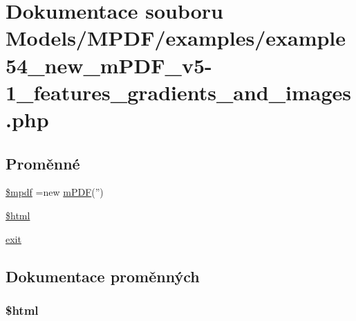 \hypertarget{example54__new__m_p_d_f__v5-1__features__gradients__and__images_8php}{\section{Dokumentace souboru Models/\-M\-P\-D\-F/examples/example54\-\_\-new\-\_\-m\-P\-D\-F\-\_\-v5-\/1\-\_\-features\-\_\-gradients\-\_\-and\-\_\-images.php}
\label{example54__new__m_p_d_f__v5-1__features__gradients__and__images_8php}
}
\subsection*{Proměnné}
\begin{DoxyCompactItemize}
\item 
\hyperlink{example54__new__m_p_d_f__v5-1__features__gradients__and__images_8php_ad028f81910d6cbab9b184d2214b3a8f8}{\$mpdf} =new \hyperlink{classm_p_d_f}{m\-P\-D\-F}('')
\item 
\hyperlink{example54__new__m_p_d_f__v5-1__features__gradients__and__images_8php_a6f96e7fc92441776c9d1cd3386663b40}{\$html}
\item 
\hyperlink{example54__new__m_p_d_f__v5-1__features__gradients__and__images_8php_a6733eb5f605d09eaede9845835d71c4e}{exit}
\end{DoxyCompactItemize}


\subsection{Dokumentace proměnných}
\hypertarget{example54__new__m_p_d_f__v5-1__features__gradients__and__images_8php_a6f96e7fc92441776c9d1cd3386663b40}{
\subsubsection[{\$html}]{\setlength{\rightskip}{0pt plus 5cm}\$html}}\label{example54__new__m_p_d_f__v5-1__features__gradients__and__images_8php_a6f96e7fc92441776c9d1cd3386663b40}



